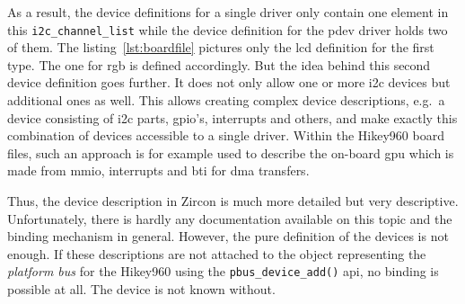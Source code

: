 %
As a result, the device definitions for a single driver only contain one element in this \texttt{i2c_channel_list} while the device definition for the pdev driver holds two of them.
The listing~\ref{lst:boardfile} pictures only the \ac{lcd} definition for the first type.
The one for \ac{rgb} is defined accordingly.
But the idea behind this second device definition goes further.
It does not only allow one or more \ac{i2c} devices but additional ones as well.
This allows creating complex device descriptions, e.g.\ a device consisting of \ac{i2c} parts, \ac{gpio}'s, interrupts and others, and make exactly this combination of devices accessible to a single driver.
Within the Hikey960 board files, such an approach is for example used to describe the on-board \ac{gpu} which is made from \ac{mmio}, interrupts and \ac{bti} for \ac{dma} transfers.

Thus, the device description in Zircon is much more detailed but very descriptive.
Unfortunately, there is hardly any documentation available on this topic and the binding mechanism in general.
However, the pure definition of the devices is not enough.
If these descriptions are not attached to the object representing the \textit{platform bus} for the Hikey960 using the \texttt{pbus_device_add()} \ac{api}, no binding is possible at all.
The device is not known without.

